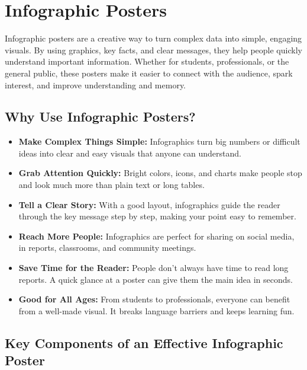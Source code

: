 \section{Infographic Posters}

Infographic posters are a creative way to turn complex data into simple, engaging visuals. By using graphics, key facts, and clear messages, they help people quickly understand important information. Whether for students, professionals, or the general public, these posters make it easier to connect with the audience, spark interest, and improve understanding and memory.

\subsection*{Why Use Infographic Posters?}

\begin{itemize}
    \item \textbf{Make Complex Things Simple:} Infographics turn big numbers or difficult ideas into clear and easy visuals that anyone can understand.
    
    \item \textbf{Grab Attention Quickly:} Bright colors, icons, and charts make people stop and look much more than plain text or long tables.
    
    \item \textbf{Tell a Clear Story:} With a good layout, infographics guide the reader through the key message step by step, making your point easy to remember.
    
    \item \textbf{Reach More People:} Infographics are perfect for sharing on social media, in reports, classrooms, and community meetings.
    
    \item \textbf{Save Time for the Reader:} People don’t always have time to read long reports. A quick glance at a poster can give them the main idea in seconds.
    
    \item \textbf{Good for All Ages:} From students to professionals, everyone can benefit from a well-made visual. It breaks language barriers and keeps learning fun.
\end{itemize}


\subsection*{Key Components of an Effective Infographic Poster}

